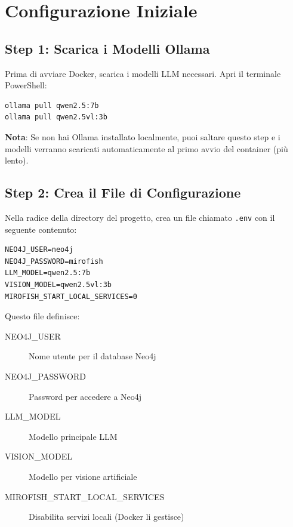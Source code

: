 \section{Configurazione Iniziale}

\subsection{Step 1: Scarica i Modelli Ollama}

Prima di avviare Docker, scarica i modelli LLM necessari. Apri il terminale PowerShell:

\begin{lstlisting}
ollama pull qwen2.5:7b
ollama pull qwen2.5vl:3b
\end{lstlisting}

\textbf{Nota}: Se non hai Ollama installato localmente, puoi saltare questo step e i modelli verranno scaricati automaticamente al primo avvio del container (più lento).

\subsection{Step 2: Crea il File di Configurazione}

Nella radice della directory del progetto, crea un file chiamato \texttt{.env} con il seguente contenuto:

\begin{lstlisting}
NEO4J_USER=neo4j
NEO4J_PASSWORD=mirofish
LLM_MODEL=qwen2.5:7b
VISION_MODEL=qwen2.5vl:3b
MIROFISH_START_LOCAL_SERVICES=0
\end{lstlisting}

Questo file definisce:
\begin{description}
    \item[NEO4J\_USER] Nome utente per il database Neo4j
    \item[NEO4J\_PASSWORD] Password per accedere a Neo4j
    \item[LLM\_MODEL] Modello principale LLM
    \item[VISION\_MODEL] Modello per visione artificiale
    \item[MIROFISH\_START\_LOCAL\_SERVICES] Disabilita servizi locali (Docker li gestisce)
\end{description}
